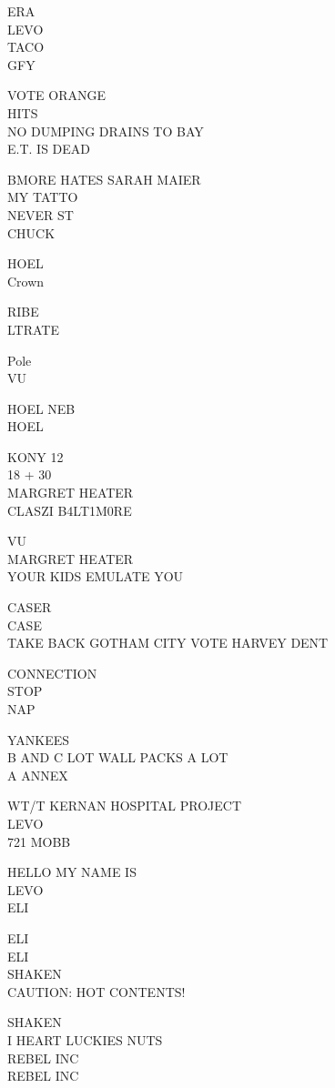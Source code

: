 \documentclass[10pt,letterpaper]{article}
\begin{document}
ERA\\
LEVO\\
TACO\\
GFY

VOTE ORANGE\\
HITS\\
NO DUMPING DRAINS TO BAY\\
E.T. IS DEAD

BMORE HATES SARAH MAIER\\
MY TATTO\\
NEVER ST\\
CHUCK

HOEL\\
Crown

RIBE\\
LTRATE

Pole\\
VU

HOEL NEB\\
HOEL

KONY 12\\
18 + 30\\
MARGRET HEATER\\
CLASZI B4LT1M0RE

VU\\
MARGRET HEATER\\
YOUR KIDS EMULATE YOU

CASER\\
CASE\\
TAKE BACK GOTHAM CITY VOTE HARVEY DENT

CONNECTION\\
STOP\\
NAP

YANKEES\\
B AND C LOT WALL PACKS A LOT\\
A ANNEX

WT/T KERNAN HOSPITAL PROJECT\\
LEVO\\
721 MOBB

HELLO MY NAME IS\\
LEVO\\
ELI

ELI\\
ELI\\
SHAKEN\\
CAUTION: HOT CONTENTS!

SHAKEN\\
I HEART LUCKIES NUTS\\
REBEL INC\\
REBEL INC
\end{document}
